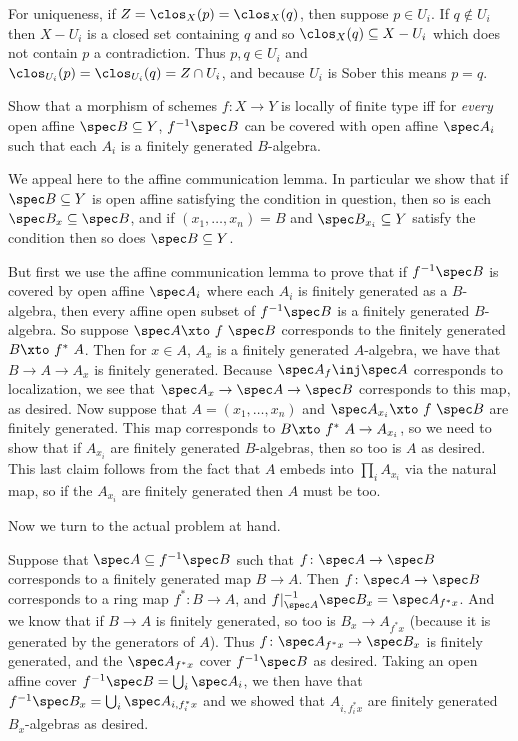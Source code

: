 For uniqueness, if $Z=\clos_X(p)=\clos_X(q)$, then suppose $p\in U_i$.
If $q\notin U_i$ then $X-U_i$ is a closed set containing $q$ and so $\clos_X(q)\subseteq X-U_i$ which does not contain $p$ a contradiction.
Thus $p,q\in U_i$ and $\clos_{U_i}(p)=\clos_{U_i}(q)=Z\cap U_i$, and because $U_i$ is Sober this means $p=q$.

\bprob[title={Hartshorne II.3.1}]

    Show that a morphism of schemes $f\colon X\to Y$ is locally of finite type iff for {\it every\/} open affine $\spec B\subseteq Y$, $f^{-1}\spec B$
    can be covered with open affine $\spec A_i$ such that each $A_i$ is a finitely generated $B$-algebra.

\eprob

We appeal here to the affine communication lemma.
In particular we show that if $\spec B\subseteq Y$ is open affine satisfying the condition in question, then so is each $\spec B_x\subseteq\spec B$,
and if $(x_1,\dots,x_n)=B$ and $\spec B_{x_i}\subseteq Y$ satisfy the condition then so does $\spec B\subseteq Y$.

But first we use the affine communication lemma to prove that if $f^{-1}\spec B$ is covered by open affine $\spec A_i$ where each $A_i$
is finitely generated as a $B$-algebra, then every affine open subset of $f^{-1}\spec B$ is a finitely generated $B$-algebra.
So suppose $\spec A\xtos f\spec B$ corresponds to the finitely generated $B\xtos{f^*}A$.
Then for $x\in A$, $A_x$ is a finitely generated $A$-algebra, we have that $B\to A\to A_x$ is finitely generated.
Because $\spec A_f\inj\spec A$ corresponds to localization, we see that $\spec A_x\to\spec A\to\spec B$ corresponds to this map, as desired.
Now suppose that $A=(x_1,\dots,x_n)$ and $\spec A_{x_i}\xtos f\spec B$ are finitely generated.
This map corresponds to $B\xtos{f^*}A\to A_{x_i}$, so we need to show that if $A_{x_i}$ are finitely generated $B$-algebras, then so too is $A$ as desired.
This last claim follows from the fact that $A$ embeds into $\prod_iA_{x_i}$ via the natural map, so if the $A_{x_i}$ are finitely generated
then $A$ must be too.

Now we turn to the actual problem at hand.

Suppose that $\spec A\subseteq f^{-1}\spec B$ such that $f\colon\spec A\to\spec B$ corresponds to a finitely generated map $B\to A$.
Then $f\colon\spec A\to\spec B$ corresponds to a ring map $f^*\colon B\to A$, and $f|_{\spec A}^{-1}\spec B_x=\spec A_{f^*x}$.
And we know that if $B\to A$ is finitely generated, so too is $B_x\to A_{f^*x}$ (because it is generated by the generators of $A$).
Thus $f\colon\spec A_{f^*x}\to\spec B_x$ is finitely generated, and the $\spec A_{f^*x}$ cover $f^{-1}\spec B$ as desired.
Taking an open affine cover $f^{-1}\spec B=\bigcup_i\spec A_i$, we then have that $f^{-1}\spec B_x=\bigcup_i\spec A_{i,f_i^*x}$ and we showed that
$A_{i,f_i^*x}$ are finitely generated $B_x$-algebras as desired.

